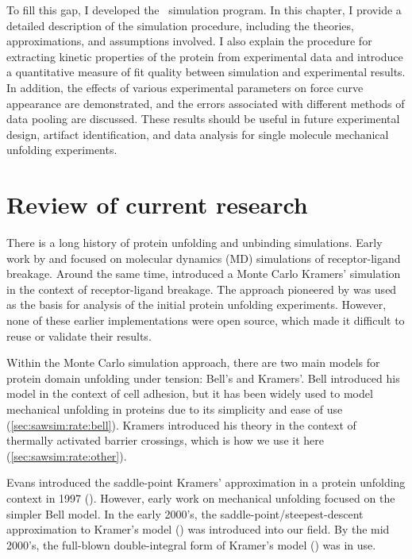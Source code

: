 To fill this gap, I developed the \sawsim\ simulation
program\citep{king10}.  In this chapter, I provide a detailed
description of the simulation procedure, including the theories,
approximations, and assumptions involved.  I also explain the
procedure for extracting kinetic properties of the protein from
experimental data and introduce a quantitative measure of fit quality
between simulation and experimental results.  In addition, the effects
of various experimental parameters on force curve appearance are
demonstrated, and the errors associated with different methods of data
pooling are discussed.  These results should be useful in future
experimental design, artifact identification, and data analysis for
single molecule mechanical unfolding experiments.

\section{Review of current research}

There is a long history of protein unfolding and unbinding
simulations.  Early work by \citet{grubmuller96} and
\citet{izrailev97} focused on molecular dynamics (MD) simulations of
receptor-ligand breakage.  Around the same time, \citet{evans97}
introduced a Monte Carlo Kramers' simulation in the context of
receptor-ligand breakage.  The approach pioneered by \citet{evans97}
was used as the basis for analysis of the initial protein unfolding
experiments\citep{rief97a}.  However, none of these earlier
implementations were open source, which made it difficult to reuse or
validate their results.
%

Within the Monte Carlo simulation approach, there are two main models
for protein domain unfolding under tension: Bell's and
Kramers'\citep{schlierf06,hummer03,dudko06}.  Bell introduced his
model in the context of cell adhesion\citep{bell78}, but it has been
widely used to model mechanical unfolding in
proteins\citep{rief97a,carrion-vazquez99b,schlierf06} due to its
simplicity and ease of use\citep{hummer03}
(\cref{sec:sawsim:rate:bell}).  Kramers introduced his theory in the
context of thermally activated barrier crossings, which is how we use
it here (\cref{sec:sawsim:rate:other}).

Evans introduced the saddle-point Kramers' approximation in a protein
unfolding context in 1997 ().  However,
early work on mechanical unfolding focused on the simpler Bell
model\citep{rief97a}.  In the early 2000's, the
saddle-point/steepest-descent approximation to Kramer's model
() was introduced into our
field\citep{dudko03,hyeon03}.  By the mid 2000's, the full-blown
double-integral form of Kramer's model
() was in use\citep{schlierf06}.

